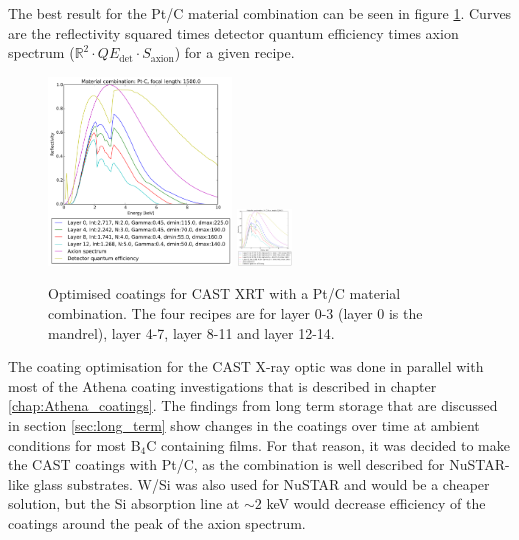 The best result for the Pt/C material combination can be seen in figure \ref{fig:pt-c_optimized_recipes}. Curves are the reflectivity squared times detector quantum efficiency times axion spectrum ($\mathbb{R}^2\cdot QE_{\text{det}}\cdot S_{\text{axion}}$) for a given recipe.

\begin{figure}[htbp]
  \centering
    \includegraphics[height=5cm]{figures/cast/pt-c_optimized_recipes1.pdf}
    \includegraphics[height=1.5cm]{figures/cast/pt-c_optimized_recipes2.pdf}
  \caption{\footnotesize Optimised coatings for CAST XRT with a Pt/C material combination. The four recipes are for layer 0-3 (layer 0 is the mandrel), layer 4-7, layer 8-11 and layer 12-14.}
  \label{fig:pt-c_optimized_recipes}
\end{figure}

The coating optimisation for the CAST X-ray optic was done in parallel with most of the Athena coating investigations that is described in chapter \ref{chap:Athena_coatings}. The findings from long term storage that are discussed in section \ref{sec:long_term} show changes in the coatings over time at ambient conditions for most B$_4$C containing films. For that reason, it was decided to make the CAST coatings with Pt/C, as the combination is well described for NuSTAR-like glass substrates. W/Si was also used for NuSTAR and would be a cheaper solution, but the Si absorption line at $\sim2$ keV would decrease efficiency of the coatings around the peak of the axion spectrum.

